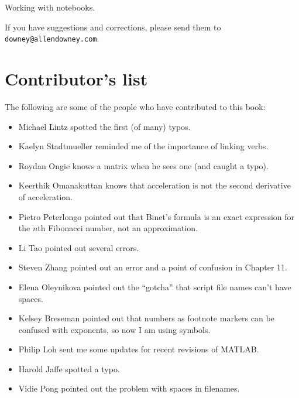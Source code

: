 \documentclass[
]{book}
\begin{document}
Working with notebooks.


If you have suggestions and corrections, please send them to
{\tt downey@allendowney.com}.



\newpage

\section*{Contributor's list}

The following are some of the people who have contributed to this
book:

\begin{itemize}

\item Michael Lintz spotted the first (of many) typos.

\item Kaelyn Stadtmueller reminded me of the importance of linking
verbs.

\item Roydan Ongie knows a matrix when he sees one (and caught a typo).

\item Keerthik Omanakuttan knows that acceleration is not the
second derivative of acceleration.

\item Pietro Peterlongo pointed out that Binet's formula is an
exact expression for the $n$th Fibonacci number, not an approximation.

\item Li Tao pointed out several errors.

\item Steven Zhang pointed out an error and a point of confusion
in Chapter 11.

\item Elena Oleynikova pointed out the ``gotcha'' that script file names
can't have spaces.

\item Kelsey Breseman pointed out that numbers as footnote markers
can be confused with exponents, so now I am using symbols.

\item Philip Loh sent me some updates for recent revisions of MATLAB.

\item Harold Jaffe spotted a typo.

\item Vidie Pong pointed out the problem with spaces in filenames.


\end{itemize}
\end{document}
